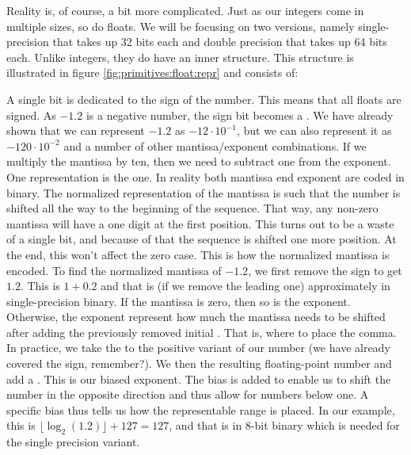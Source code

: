 Reality is, of course, a bit more complicated. Just as our integers come in multiple sizes, so do floats. We will be focusing on two versions, namely single-precision that takes up 32 bits each and double precision that takes up 64 bits each. Unlike integers, they do have an inner structure. This structure is illustrated in figure \ref{fig:primitives:float:repr} and consists of:
\begin{itemize}
   A single bit is dedicated to the sign of the number. This means that all floats are signed. As $-1.2$ is a negative number, the sign bit becomes a .
   We have already shown that we can represent $-1.2$ as $-12 \cdot 10^{-1}$, but we can also represent it as $-120 \cdot 10^{-2}$ and a number of other mantissa/exponent combinations. If we multiply the mantissa by ten, then we need to subtract one from the exponent. One representation is the  one. In reality both mantissa end exponent are coded in binary. The normalized representation of the mantissa is such that the number is shifted all the way to the beginning of the sequence. That way, any non-zero mantissa will have a one digit at the first position. This turns out to be a waste of a single bit, and because of that the sequence is shifted one more position. At the end, this won't affect the zero case. This is how the normalized mantissa is encoded. To find the normalized mantissa of $-1.2$, we first remove the sign to get $1.2$. This is $1+0.2$ and that is (if we remove the leading one) approximately  in single-precision binary.
   If the mantissa is zero, then so is the exponent. Otherwise, the exponent represent how much the mantissa needs to be shifted after adding the previously removed initial . That is, where to place the comma. In practice, we take the  to the positive variant of our number (we have already covered the sign, remember?). We then  the resulting floating-point number and add a . This is our biased exponent. The bias is added to enable us to shift the number in the opposite direction and thus allow for numbers below one. A specific bias thus tells us how the representable range is placed. In our example, this is $\lfloor \log_2(1.2) \rfloor + 127 = 127$, and that is  in 8-bit binary which is needed for the single precision variant.
\end{itemize}

